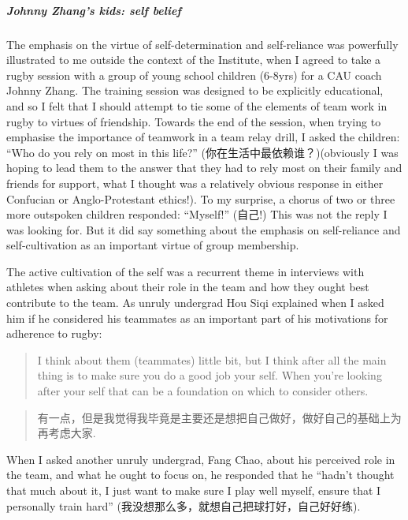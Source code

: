 \begin{CJK}{UTF8}{gbsn}
\subparagraph{Johnny Zhang's kids: self belief}
The emphasis on the virtue of self-determination and self-reliance was powerfully illustrated to me outside the context of the Institute, when I agreed to take a rugby session with a group of young school children (6-8yrs) for a CAU coach Johnny Zhang.  The training session was designed to be explicitly educational, and so I felt that I should attempt to tie some of the elements of team work in rugby to virtues of friendship.  Towards the end of the session, when trying to emphasise the importance of teamwork in a team relay drill, I asked the children: ``Who do you rely on most in this life?'' (你在生活中最依赖谁？)(obviously I was hoping to lead them to the answer that they had to rely most on their family and friends for support, what I thought was a relatively obvious response in either Confucian or Anglo-Protestant ethics!).  To my surprise, a chorus of two or three more outspoken children responded: ``Myself!'' (自己!) This was not the reply I was looking for. But it did say something about the emphasis on self-reliance and self-cultivation as an important virtue of group membership.


The active cultivation of the self was a recurrent theme in interviews with athletes when asking about their role in the team and how they ought best contribute to the team.  As unruly undergrad Hou Siqi explained when I asked him if he considered his teammates as an important part of his motivations for adherence to rugby:

\begin{quotation}
  I think about them (teammates) little bit, but I think after all the main thing is to make sure you do a good job your self.  When you're looking after your self that can be a foundation on which to consider others.
\end{quotation}

\begin{quotation}
  有一点，但是我觉得我毕竟是主要还是想把自己做好，做好自己的基础上为再考虑大家.
\end{quotation}

When I asked another unruly undergrad, Fang Chao, about his perceived role in the team, and what he ought to focus on, he responded that he ``hadn't thought that much about it, I just want to make sure I play well myself, ensure that I personally train hard'' (我没想那么多，就想自己把球打好，自己好好练).


\end{CJK}
